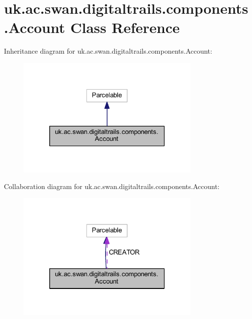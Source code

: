 \hypertarget{classuk_1_1ac_1_1swan_1_1digitaltrails_1_1components_1_1_account}{\section{uk.\+ac.\+swan.\+digitaltrails.\+components.\+Account Class Reference}
\label{classuk_1_1ac_1_1swan_1_1digitaltrails_1_1components_1_1_account}
}


Inheritance diagram for uk.\+ac.\+swan.\+digitaltrails.\+components.\+Account\+:\nopagebreak
\begin{figure}[H]
\begin{center}
\leavevmode
\includegraphics[width=255pt]{classuk_1_1ac_1_1swan_1_1digitaltrails_1_1components_1_1_account__inherit__graph}
\end{center}
\end{figure}


Collaboration diagram for uk.\+ac.\+swan.\+digitaltrails.\+components.\+Account\+:\nopagebreak
\begin{figure}[H]
\begin{center}
\leavevmode
\includegraphics[width=255pt]{classuk_1_1ac_1_1swan_1_1digitaltrails_1_1components_1_1_account__coll__graph}
\end{center}
\end{figure}
